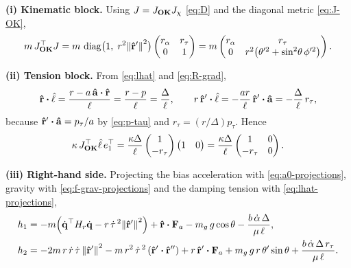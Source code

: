 \documentclass[10pt, a4paper]{article}
\begin{document}
\noindent\textbf{(i) Kinematic block.}
Using $J = J_{\vb{OK}} J_\chi$ \eqref{eq:D} and the diagonal metric
\eqref{eq:J-OK},
\begin{equation}
    m\,J_{\vb{OK}}^\top J
    = m\, \operatorname{diag}\bigl(1,\; r^2\norm{\vu r'}^2\bigr)
    \begin{pmatrix} r_\alpha & r_\tau \\ 0 & 1 \end{pmatrix}
    = m \begin{pmatrix}
        r_\alpha & r_\tau \\
        0 & r^2\bigl( \theta'^2 + \sin^2\!\theta\,\phi'^2 \bigr)
    \end{pmatrix}.
\end{equation}

\noindent\textbf{(ii) Tension block.}
From \eqref{eq:lhat} and \eqref{eq:R-grad},
\begin{equation} \label{eq:lhat-projections}
    \rhat \vdot \lhat = \frac{r - a\,\ahat\vdot\rhat}{\ell}
    = \frac{r - p}{\ell}
    = \frac{\Delta}{\ell},
    \qquad
    r\,\rhat' \vdot \lhat
    = -\frac{a r}{\ell}\, \rhat'\vdot\ahat
    = -\frac{\Delta}{\ell}\, r_\tau ,
\end{equation}
because $\rhat'\vdot\ahat = p_\tau/a$ by \eqref{eq:p-tau} and
$r_\tau = (r/\Delta) p_\tau$.  Hence
\begin{equation}
    \kappa\, J_{\vb{OK}}^\top \hat \ell\, e_1^\top
    = \frac{\kappa\Delta}{\ell}
    \begin{pmatrix} 1 \\ -r_\tau \end{pmatrix}
    \begin{pmatrix} 1 & 0 \end{pmatrix}
    = \frac{\kappa\Delta}{\ell}
    \begin{pmatrix} 1 & 0 \\ -r_\tau & 0 \end{pmatrix}.
\end{equation}

\noindent\textbf{(iii) Right-hand side.}
Projecting the bias acceleration with \eqref{eq:a0-projections}, gravity
with \eqref{eq:f-grav-projections} and the damping tension with
\eqref{eq:lhat-projections},
\begin{equation} \label{eq:h-explicit}
    \begin{aligned}
        h_1 &= -m \Bigl( \dq^\top H_r \dq
        - r\,\dot\tau^{\,2} \norm{\rhat'}^2 \Bigr)
        + \rhat \vdot \vb F_a
        - m_g\, g \cos\theta
        - \frac{b\,\dot\alpha\,\Delta}{\mu\,\ell}, \\
        h_2 &= -2m\,r\,\dot r\,\dot\tau\,\norm{\rhat'}^2
        - m\,r^2\,\dot\tau^{\,2}\,(\rhat'\vdot\rhat'')
        + r\,\rhat' \vdot \vb F_a
        + m_g\, g\, r\,\theta'\sin\theta
        + \frac{b\,\dot\alpha\,\Delta\,r_\tau}{\mu\,\ell}.
    \end{aligned}
\end{equation}
\end{document}
